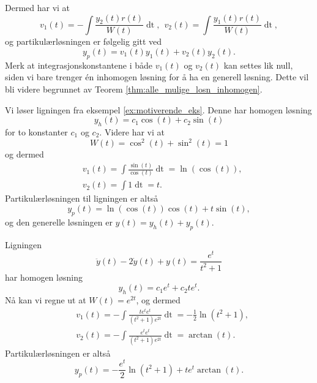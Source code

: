 \documentclass{article}
\theoremstyle{definition}
\theoremstyle{remark}
\newenvironment{ex}
{\pushQED{\qed}\renewcommand{\qedsymbol}{$\triangle$}\exx}
{\popQED\endexx}
\begin{document}
\begin{multicols*}{2}
\begin{equation*}
\end{equation*}
Dermed har vi at
\begin{equation*}
  v_1(t) = -\int \frac{y_2(t) r(t)}{W(t)} \mathop{dt}, \ \ v_2(t) = \int \frac{y_1(t) r(t)}{W(t)} \mathop{dt},
\end{equation*}
og partikulærløsningen er følgelig gitt ved
\begin{equation*}
  y_p(t) = v_1(t) y_1(t) + v_2(t) y_2(t).
\end{equation*}
Merk at integrasjonskonstantene i både $v_1(t)$ og $v_2(t)$ kan settes lik null, siden vi bare trenger én inhomogen løsning for å ha en generell løsning. Dette vil bli videre begrunnet av Teorem \ref{thm:alle_mulige_losn_inhomogen}.

\begin{ex}
  Vi løser ligningen fra eksempel \ref{ex:motiverende_eks}. Denne har homogen løsning
  \begin{equation*}
    y_h(t) = c_1 \cos(t) + c_2 \sin(t)
  \end{equation*}
  for to konstanter $c_1$ og $c_2$. Videre har vi at
  \begin{equation*}
    W(t) = \cos^2(t) + \sin^2(t) = 1
  \end{equation*}
  og dermed
  \begin{equation*}
    \begin{split}
      & v_1(t) = \int \frac{\sin(t)}{\cos(t)} \mathop{dt} = \ln(\cos(t)), \\
      & v_2(t) = \int 1 \mathop{dt} = t.
    \end{split}
  \end{equation*}
  Partikulærløsningen til ligningen er altså
  \begin{equation*}
    y_p(t) = \ln(\cos(t)) \cos(t) + t \sin(t),
  \end{equation*}
  og den generelle løsningen er $y(t) = y_h(t) + y_p(t)$.
\end{ex}

\begin{ex}
  Ligningen
  \begin{equation*}
    \ddot{y}(t) - 2\dot{y}(t) + y(t) = \frac{e^t}{t^2 + 1}
  \end{equation*}
  har homogen løsning
  \begin{equation*}
    y_h(t) = c_1 e^t + c_2 t e^{t}.
  \end{equation*}
  Nå kan vi regne ut at $W(t) = e^{2t}$, og dermed
  \begin{equation*}
    \begin{split}
      & v_1(t) = - \int \frac{t e^t e^t}{(t^2 + 1) e^{2t}} \mathop{dt} = - \frac{1}{2} \ln(t^2 + 1), \\
      & v_2(t) = - \int \frac{e^t e^t}{(t^2 + 1) e^{2t}} \mathop{dt} = \arctan(t).
    \end{split}
  \end{equation*}
  Partikulærløsningen er altså
  \begin{equation*}
    y_p(t) = - \frac{e^t}{2} \ln(t^2 + 1) + t e^t \arctan(t).
  \end{equation*}
\end{ex}


\end{multicols*}
\end{document}
